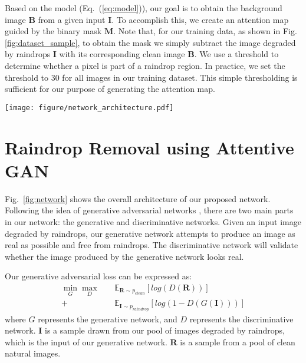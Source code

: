 \documentclass[10pt,twocolumn,letterpaper]{article}
\begin{document}
Based on the model (Eq.~(\ref{eq:model})), our goal is to obtain the background image $\mathbf{B}$ from a given input $\mathbf{I}$. To accomplish this, we create an attention map guided by the binary mask $\mathbf{M}$. 
Note that, for our training data, as shown in Fig. \ref{fig:dataset_sample}, to obtain the mask we simply subtract the image degraded by raindrops $\mathbf{I}$ with its corresponding clean image $\mathbf{B}$. We use a threshold to determine whether a pixel is part of a raindrop region. In practice, we set the threshold to 30 for all images in our training dataset. This simple thresholding is sufficient for our purpose of generating the attention map.





\begin{figure*}[h]
	\begin{center}
		\texttt{[image: figure/network\_architecture.pdf]}
	\end{center}
	\caption{The architecture of our proposed attentive GAN.The generator  consists of an attentive-recurrent network and a contextual autoencoder with skip connections. The discriminator is formed by a series of convolution layers and guided by the attention map. Best viewed in color.}
	\label{fig:network}
\end{figure*}

\section{Raindrop Removal using Attentive GAN}
\label{sec:our_method}

Fig.~\ref{fig:network} shows the overall architecture of our proposed network. Following the  idea of  generative adversarial networks \cite{goodfellow2014generative}, there are two main parts in our network: the generative and discriminative networks.  Given an input image degraded by raindrops, our generative network attempts to produce an image as real as possible and free from raindrops. The discriminative network will validate whether the image produced by the generative network looks real. 

Our generative adversarial loss can be expressed as:
\begin{equation}
\begin{split}
\min \limits_{G} \max \limits_{D}  & \quad \mathbb{E}_{\mathbf{R} \sim p_{clean}} [log(D(\mathbf{R}))] \\ +
 & \quad \mathbb{E}_{\mathbf{I} \sim p_{raindrop}} [log(1 - D(G(\mathbf{I})))]
\end{split}
\end{equation}
where $G$ represents the generative network, and $D$ represents the discriminative network. $\mathbf{I}$ is a sample drawn from our pool of images degraded by raindrops, which is the input of our generative network. $\mathbf{R}$ is a sample from a pool of clean natural images. 
\end{document}
